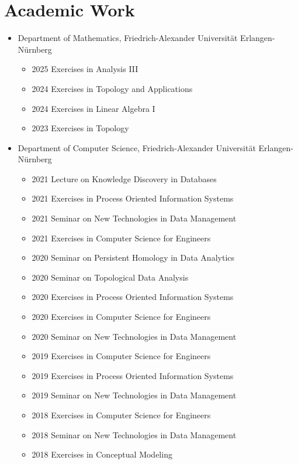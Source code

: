\documentclass[a4paper, 12pt]{article}
\newcommand{\years}[1]{\marginnote{\scriptsize #1}}
\begin{document}
\section*{Academic Work}
\years{Teaching}
\vspace{-2pt}
\begin{itemize}[noitemsep, leftmargin=*]
	\item Department of Mathematics, Friedrich-Alexander Universität Erlangen-Nürnberg
	      \begin{itemize}
	      	\item 2025 Exercises in Analysis III
	      	\item 2024 Exercises in Topology and Applications
	      	\item 2024 Exercises in Linear Algebra I
	      	\item 2023 Exercises in Topology
	      \end{itemize}
	\item Department of Computer Science, Friedrich-Alexander Universität Erlangen-Nürnberg
	      \begin{itemize}
	      	\item 2021 Lecture on Knowledge Discovery in Databases
	      	\item 2021 Exercises in Process Oriented Information Systems
	      	\item 2021 Seminar on New Technologies in Data Management
	      	\item 2021 Exercises in Computer Science for Engineers
	      	\item 2020 Seminar on Persistent Homology in Data Analytics
	      	\item 2020 Seminar on Topological Data Analysis
	      	\item 2020 Exercises in Process Oriented Information Systems
	      	\item 2020 Exercises in Computer Science for Engineers
	      	\item 2020 Seminar on New Technologies in Data Management
	      	\item 2019 Exercises in Computer Science for Engineers
	      	\item 2019 Exercises in Process Oriented Information Systems
	      	\item 2019 Seminar on New Technologies in Data Management
	      	\item 2018 Exercises in Computer Science for Engineers
	      	\item 2018 Seminar on New Technologies in Data Management
	      	\item 2018 Exercises in Conceptual Modeling
	      \end{itemize}
\end{itemize}
\vspace{10pt}
\end{document}
